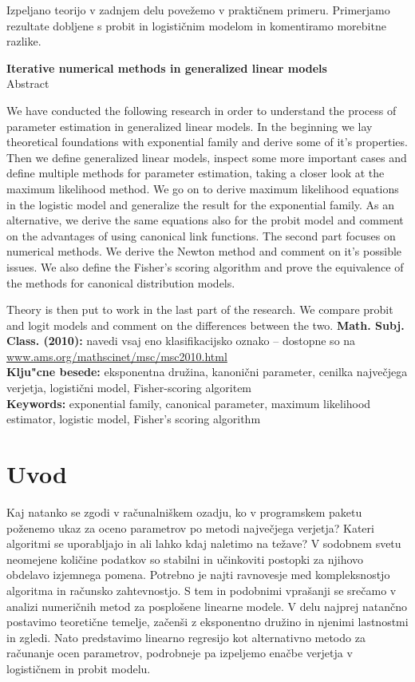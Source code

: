 \documentclass[12pt,a4paper]{amsart}
\theoremstyle{definition} %
\theoremstyle{plain} %
\begin{document}
Izpeljano teorijo v zadnjem delu povežemo v praktičnem primeru. Primerjamo rezultate dobljene s probit in logističnim modelom in komentiramo morebitne razlike.
\vfill
\begin{center}
{\bf Iterative numerical methods in generalized linear models}\\[3mm] %
{\sc Abstract}
\end{center}
We have conducted the following research in order to understand the process of parameter estimation in generalized linear models. In the beginning we lay theoretical
foundations with exponential family and derive some of it's properties. Then we define generalized linear models, inspect some more important cases and define multiple
methods for parameter estimation, taking a closer look at the maximum likelihood method. We go on to derive maximum likelihood equations in the logistic model and generalize the 
result for the exponential family. As an alternative, we derive the same equations also for the probit model and comment on the advantages of using canonical link functions.
The second part focuses on numerical methods. We derive the Newton method and comment on it's possible issues. We also define the Fisher's scoring algorithm and prove 
the equivalence of the methods for canonical distribution models.

Theory is then put to work in the last part of the research. We compare probit and logit models and comment on the differences between the two.
\vfill\noindent
{\bf Math. Subj. Class. (2010):} navedi vsaj eno klasifikacijsko oznako -- dostopne so na \url{www.ams.org/mathscinet/msc/msc2010.html}  \\[1mm]
{\bf Klju"cne besede:} eksponentna družina, kanonični parameter, cenilka največjega verjetja, logistični model, Fisher-scoring algoritem  \\[1mm]
{\bf Keywords:} exponential family, canonical parameter, maximum likelihood estimator, logistic model, Fisher's scoring algorithm
\pagebreak



\section{Uvod}
Kaj natanko se zgodi v računalniškem ozadju, ko v programskem paketu poženemo ukaz za oceno parametrov po metodi največjega verjetja? Kateri algoritmi se uporabljajo in 
ali lahko kdaj naletimo na težave? V sodobnem svetu neomejene količine podatkov so stabilni in učinkoviti postopki za njihovo obdelavo izjemnega pomena. Potrebno je najti
ravnovesje med kompleksnostjo algoritma in računsko zahtevnostjo. S tem in podobnimi vprašanji se srečamo v analizi numeričnih metod za posplošene linearne modele.
V delu najprej natančno postavimo teoretične temelje, začenši z eksponentno družino in njenimi lastnostmi in zgledi. Nato predstavimo linearno regresijo kot alternativno metodo
za računanje ocen parametrov, podrobneje pa izpeljemo enačbe verjetja v logističnem in probit modelu. 
\end{document}
